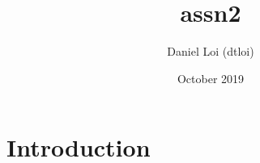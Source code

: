 \documentclass{article}
\title{assn2}
\author{Daniel Loi (dtloi)}
\date{October 2019}
\begin{document}
\maketitle

\section{Introduction}
\end{document}
